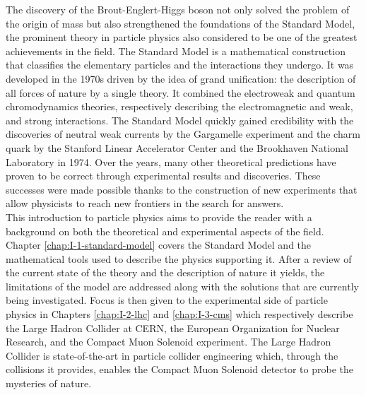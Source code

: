 The discovery of the Brout-Englert-Higgs boson not only solved the problem of the origin of mass but also strengthened the foundations of the Standard Model, the prominent theory in particle physics also considered to be one of the greatest achievements in the field. The Standard Model is a mathematical construction that classifies the elementary particles and the interactions they undergo. It was developed in the 1970s driven by the idea of grand unification: the description of all forces of nature by a single theory. It combined the electroweak and quantum chromodynamics theories, respectively describing the electromagnetic and weak, and strong interactions. The Standard Model quickly gained credibility with the discoveries of neutral weak currents by the Gargamelle experiment and the charm quark by the Stanford Linear Accelerator Center and the Brookhaven National Laboratory in 1974. Over the years, many other theoretical predictions have proven to be correct through experimental results and discoveries. These successes were made possible thanks to the construction of new experiments that allow physicists to reach new frontiers in the search for answers. \\

This introduction to particle physics aims to provide the reader with a background on both the theoretical and experimental aspects of the field. Chapter \ref{chap:I-1-standard-model} covers the Standard Model and the mathematical tools used to describe the physics supporting it. After a review of the current state of the theory and the description of nature it yields, the limitations of the model are addressed along with the solutions that are currently being investigated. Focus is then given to the experimental side of particle physics in Chapters \ref{chap:I-2-lhc} and \ref{chap:I-3-cms} which respectively describe the Large Hadron Collider at CERN, the European Organization for Nuclear Research, and the Compact Muon Solenoid experiment. The Large Hadron Collider is state-of-the-art in particle collider engineering which, through the collisions it provides, enables the Compact Muon Solenoid detector to probe the mysteries of nature.
